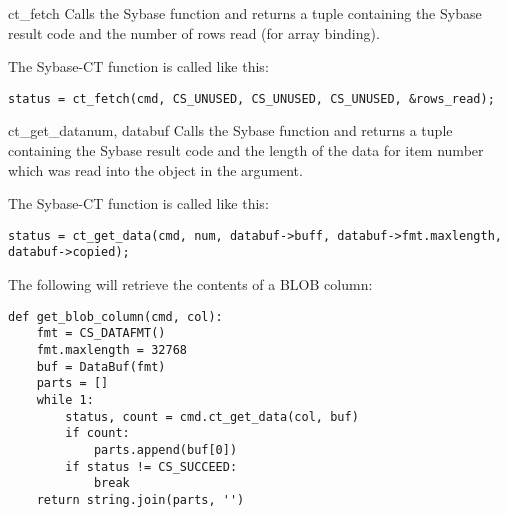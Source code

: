 \begin{methoddesc}[CS_COMMAND]{ct_fetch}{}
Calls the Sybase  function and returns a tuple
containing the Sybase result code and the number of rows read (for
array binding).

The Sybase-CT  function is called like this:

\begin{verbatim}
status = ct_fetch(cmd, CS_UNUSED, CS_UNUSED, CS_UNUSED, &rows_read);
\end{verbatim}
\end{methoddesc}

\begin{methoddesc}[CS_COMMAND]{ct_get_data}{num, databuf}
Calls the Sybase  function and returns a tuple
containing the Sybase result code and the length of the data for item
number  which was read into the  object in the
 argument.

The Sybase-CT  function is called like this:

\begin{verbatim}
status = ct_get_data(cmd, num, databuf->buff, databuf->fmt.maxlength, databuf->copied);
\end{verbatim}

The following will retrieve the contents of a BLOB column:

\begin{verbatim}
def get_blob_column(cmd, col):
    fmt = CS_DATAFMT()
    fmt.maxlength = 32768
    buf = DataBuf(fmt)
    parts = []
    while 1:
        status, count = cmd.ct_get_data(col, buf)
        if count:
            parts.append(buf[0])
        if status != CS_SUCCEED:
            break
    return string.join(parts, '')
\end{verbatim}
\end{methoddesc}

